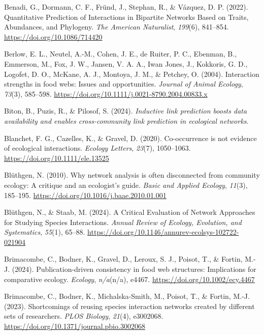 \documentclass[
]{article}
\newlength{\cslhangindent}
\newenvironment{CSLReferences}[2] %
 {\begin{list}{}{%
  \setlength{\itemindent}{0pt}
  \setlength{\leftmargin}{0pt}
  \setlength{\parsep}{0pt}
  \ifodd #1
   \setlength{\leftmargin}{\cslhangindent}
   \setlength{\itemindent}{-1\cslhangindent}
  \fi
  \setlength{\itemsep}{#2\baselineskip}}}
 {\end{list}}
\begin{document}
\begin{CSLReferences}{1}{0}
Benadi, G., Dormann, C. F., Fründ, J., Stephan, R., \& Vázquez, D. P.
(2022). Quantitative {Prediction} of {Interactions} in {Bipartite
Networks Based} on {Traits}, {Abundances}, and {Phylogeny}. \emph{The
American Naturalist}, \emph{199}(6), 841--854.
\url{https://doi.org/10.1086/714420}

Berlow, E. L., Neutel, A.-M., Cohen, J. E., de Ruiter, P. C., Ebenman,
B., Emmerson, M., Fox, J. W., Jansen, V. A. A., Iwan Jones, J.,
Kokkoris, G. D., Logofet, D. O., McKane, A. J., Montoya, J. M., \&
Petchey, O. (2004). Interaction strengths in food webs: Issues and
opportunities. \emph{Journal of Animal Ecology}, \emph{73}(3), 585--598.
\url{https://doi.org/10.1111/j.0021-8790.2004.00833.x}

Biton, B., Puzis, R., \& Pilosof, S. (2024). \emph{Inductive link
prediction boosts data availability and enables cross-community link
prediction in ecological networks}.

Blanchet, F. G., Cazelles, K., \& Gravel, D. (2020). Co-occurrence is
not evidence of ecological interactions. \emph{Ecology Letters},
\emph{23}(7), 1050--1063. \url{https://doi.org/10.1111/ele.13525}

Blüthgen, N. (2010). Why network analysis is often disconnected from
community ecology: {A} critique and an ecologist's guide. \emph{Basic
and Applied Ecology}, \emph{11}(3), 185--195.
\url{https://doi.org/10.1016/j.baae.2010.01.001}

Blüthgen, N., \& Staab, M. (2024). A {Critical Evaluation} of {Network
Approaches} for {Studying Species Interactions}. \emph{Annual Review of
Ecology, Evolution, and Systematics}, \emph{55}(1), 65--88.
\url{https://doi.org/10.1146/annurev-ecolsys-102722-021904}

Brimacombe, C., Bodner, K., Gravel, D., Leroux, S. J., Poisot, T., \&
Fortin, M.-J. (2024). Publication-driven consistency in food web
structures: {Implications} for comparative ecology. \emph{Ecology},
\emph{n/a}(n/a), e4467. \url{https://doi.org/10.1002/ecy.4467}

Brimacombe, C., Bodner, K., Michalska-Smith, M., Poisot, T., \& Fortin,
M.-J. (2023). Shortcomings of reusing species interaction networks
created by different sets of researchers. \emph{PLOS Biology},
\emph{21}(4), e3002068.
\url{https://doi.org/10.1371/journal.pbio.3002068}


\end{CSLReferences}
\end{document}
